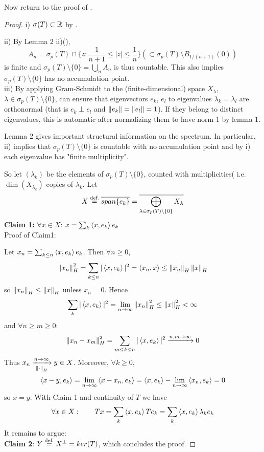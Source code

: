 \documentclass{article}
\begin{document}
Now return to the proof of .  

\begin{proof}
        i) $\sigma(T) \subset \mathbb{R}$ by .  
        
	ii) By Lemma 2 ii)(),
	$$A_n=\sigma_p(T)\cap\{z:\frac{1}{n+1}\leq|z|\leq\frac{1}{n}\}(\subset \sigma_p(T)\setminus B_{1/(n+1)}(0))$$
	is finite and $\sigma_p(T)\setminus\{0\}=\bigcup_n A_n$ is thus countable. This also implies $\sigma_p(T)\setminus\{0\}$ has no accumulation point.\\
	iii) By applying Gram-Schmidt to the (finite-dimensional) space $X_\lambda$, $\lambda\in\sigma_p(T)\setminus\{0\}$, can ensure that eigenvectors $e_k$, $e_l$ to eigenvalues $\lambda_k=\lambda_l$ are orthonormal (that is $e_k \perp e_l$ and $\left\|{e_k}\right\|=\left\|{e_l}\right\|=1$). If they belong to distinct eigenvalues,  this is automatic after normalizing them to have norm 1 by lemma 1.\\  

 \begin{remark}
      Lemma 2 gives important structural information on the spectrum. In particular, ii) implies that $\sigma_p(T)\setminus\{0\}$ is countable with no accumulation point and by i) each eigenvalue has "finite multiplicity".
 \end{remark}  
 
	So let $(\lambda_k)$ be the elements of $\sigma_p(T)\setminus\{0\}$, counted with multiplicities( i.e. $\dim(X_{\lambda_k})$ copies of $\lambda_k$. Let
	$$
		X\stackrel{\text{def.}}{=}\overline{span\{e_k\}}=\overline{\bigoplus_{\lambda\in\sigma_p(T)\setminus\{0\}}X_\lambda}
	$$
	\textbf{Claim 1:} $\forall x\in X$: $x=\sum_k \left<{x},{e_k}\right>e_k$\\
	Proof of Claim1:   
 
        Let $x_n=\sum_{k \leq n} \left<{x},{e_k}\right>e_k$.
	Then $\forall n\geq0$,
	$$
	\left\|{x_n}\right\|_H^2=\sum_{k\leq n}|\left<{x},{e_k}\right>|^2=\left<{x_n},{x}\right>\leq\left\|{x_n}\right\|_H\left\|{x}\right\|_H$$
	so $\left\|{x_n}\right\|_H\leq\left\|{x}\right\|_H$ unless $x_n=0$. Hence
	$$\sum_{k}|\left<{x},{e_k}\right>|^2=\lim_{n\to\infty}\left\|{x_n}\right\|_H^2\leq\left\|{x}\right\|_H^2<\infty$$
	and $\forall n\geq m\geq0$:
	$$\left\|{x_n-x_m}\right\|^2_H=\sum_{m\leq k\leq n}|\left<{x},{e_k}\right>|^2\xrightarrow{n,m\to\infty}0$$
	Thus $x_n\xrightarrow[\left\|{\cdot}\right\|_H]{n\to\infty}y\in X$. Moreover, $\forall k\geq 0$,
	$$\left<{x-y},{e_k}\right>=\lim_{n\to\infty}\left<{x-x_n},{e_k}\right>=\left<{x},{e_k}\right>-\lim_{n\to\infty}\left<{x_n},{e_k}\right>=0$$
	so $x=y$. With Claim 1 and continuity of $T$ we have
	$$\forall x\in X: \qquad Tx=\sum_k \left<{x},{e_k}\right>Te_k=\sum_k \left<{x},{e_k}\right>\lambda_ke_k$$
	It remains to argue:\\
	{\bf Claim 2}: $Y\stackrel{\text{def.}}{=} X^\perp=ker(T)$, which concludes the proof.  
 

\end{proof}
\end{document}
